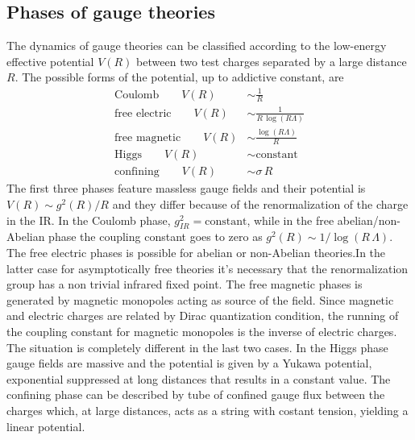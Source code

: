 \subsection{Phases of gauge theories}
The dynamics of gauge theories can be classified according to the low-energy effective potential $V(R)$ between two test charges separated by a large distance $R$.
The possible forms of the potential, up to addictive constant, are
\begin{align}
\text{Coulomb} \qquad V(R) & \sim \frac{1}{R} \\
\text{free electric} \qquad V(R) & \sim \frac{1}{R \, \log(R \Lambda) } \\
\text{free magnetic} \qquad V(R) & \sim \frac{\log(R \Lambda)}{R \,  }\\
\text{Higgs} \qquad V(R) & \sim \text{constant} \\
\text{confining} \qquad V(R) & \sim  \sigma \, R  
\end{align}
The first three phases feature massless gauge fields and their potential is $V(R) \sim g^2(R) / R$ and they differ because of the renormalization of the charge in the IR.
In the Coulomb phase, $g^2_{IR} = \text{constant}$, while in the free abelian/non-Abelian phase the coupling constant goes to zero as $g^2(R) \sim 1/ \log(R \, \Lambda)$.
The free electric phases is possible for abelian or non-Abelian theories.In the latter case for asymptotically free theories it's necessary that the renormalization group has a non trivial infrared fixed point.
The free magnetic phases is generated by magnetic monopoles acting as source of the field. Since magnetic and electric charges are related by Dirac quantization condition, the running of the coupling constant for magnetic monopoles is the inverse of electric charges.\\
The situation is completely different in the last two cases.
In the Higgs phase gauge fields are massive and the potential is given by a Yukawa potential, exponential suppressed at long distances that results in a constant value.
The confining phase can be described by tube of confined gauge flux between the charges which, at large distances, acts as a string with costant tension, yielding a linear potential.



